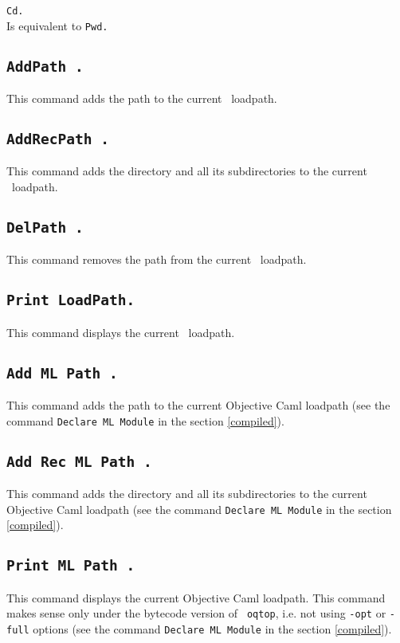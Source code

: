 \begin{Variants}
\item {\tt Cd.}\\
  Is equivalent to {\tt Pwd.}
\end{Variants}

\subsection{\tt AddPath {\str}.}
This command adds the path {\str} to the current \Coq\ loadpath.

\subsection{\tt AddRecPath {\str}.}
This command adds the directory {\str} and all its subdirectories 
to the current \Coq\ loadpath.

\subsection{\tt DelPath {\str}.}
This command removes the path {\str} from the current \Coq\ loadpath.

\subsection{\tt Print LoadPath.}
This command displays the current \Coq\ loadpath.

\subsection{\tt Add ML Path {\str}.}
This command adds the path {\str} to the current Objective Caml loadpath (see
the command {\tt Declare ML Module} in the section \ref{compiled}).

\subsection{\tt Add Rec ML Path {\str}.}
This command adds the directory {\str} and all its subdirectories 
to the current Objective Caml loadpath (see
the command {\tt Declare ML Module} in the section \ref{compiled}).

\subsection{\tt Print ML Path {\str}.}
This command displays the current Objective Caml loadpath.
This command makes sense only under the bytecode version of {\tt
oqtop}, i.e. not using {\tt -opt} or {\tt -full} options (see the
command {\tt Declare ML Module} in the section
\ref{compiled}).

